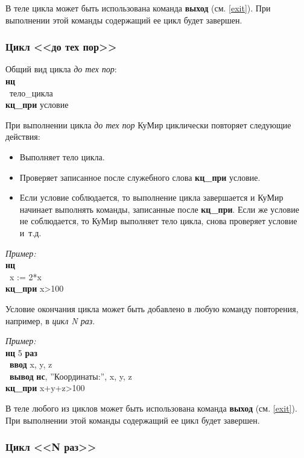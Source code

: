 \documentclass[12pt,a4paper]{article}
\newcommand{\otstup}{\textperiodcentered\ }
\begin{document}
	В теле цикла может быть использована команда \textbf{выход} (см. \ref{exit}). При выполнении этой команды содержащий ее цикл будет завершен. 


\subsubsection[Цикл ''до тех пор'']{Цикл <<до тех пор>>}

Общий вид цикла \emph{до тех пор}:\\
{\sffamily
\textbf{нц}\\
\otstup тело\_цикла\\
\textbf{кц\_при} условие
}

При выполнении цикла \emph{до тех пор} КуМир циклически повторяет следующие действия:
\begin{itemize}
\item Выполняет тело цикла.
\item Проверяет записанное после служебного слова \textbf{кц\_при} условие.
\item Если условие соблюдается, то выполнение цикла завершается и КуМир начинает выполнять команды, записанные после \textbf{кц\_при}. Если же условие не соблюдается, то КуМир выполняет тело цикла, снова проверяет условие и~т.д.
\end{itemize}

\emph{Пример:}\\
{\sffamily
\textbf{нц}\\
\otstup x := 2*x\\
\textbf{кц\_при} x>100
}

Условие окончания цикла может быть добавлено в любую команду повторения, например, в \emph{цикл N раз}.

\emph{Пример:}\\
{\sffamily
\textbf{нц} 5 \textbf{раз}\\
\otstup \textbf{ввод} x, y, z\\
\otstup \textbf{вывод} \textbf{нс}, ''Координаты:'', x, y, z\\
\textbf{кц\_при} x+y+z>100
}

В теле любого из циклов может быть использована команда \textbf{выход} (см. \ref{exit}). При выполнении этой команды содержащий ее цикл будет завершен.

\subsubsection[Цикл ''N раз'']{Цикл <<N раз>>}
\end{document}
